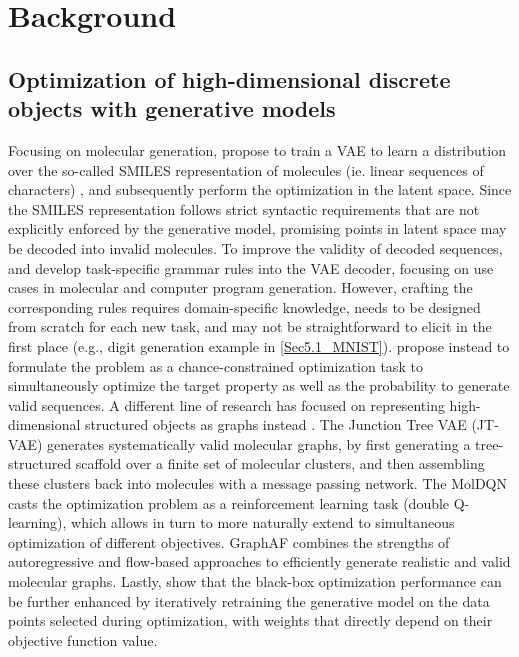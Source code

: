 \section{Background}
\label{Sec2_Background}

\subsection{Optimization of high-dimensional discrete objects with generative models}
\label{Sec2_Background_Optim}

Focusing on molecular generation, \citet{Gomez_Bombarelli_2018} propose to train a VAE to learn a distribution over the so-called SMILES representation of molecules (ie. linear sequences of characters) \citep{weininger88smiles}, and subsequently perform the optimization in the latent space. 
Since the SMILES representation follows strict syntactic requirements that are not explicitly enforced by the generative model, promising points in latent space may be decoded into invalid molecules. 
To improve the validity of decoded sequences, \citet{kusner2017grammar} and \citet{dai2018syntaxdirected} develop task-specific grammar rules into the VAE decoder, focusing on use cases in molecular and computer program generation. However, crafting the corresponding rules requires domain-specific knowledge, needs to be designed from scratch for each new task, and may not be straightforward to elicit in the first place (e.g., digit generation example in \ref{Sec5.1_MNIST}). \citet{liu2020chanceconstrained} propose instead to formulate the problem as a chance-constrained optimization task to simultaneously optimize the target property as well as the probability to generate valid sequences. 
A different line of research has focused on representing high-dimensional structured objects as graphs instead \citep{duvenaud2015convolutional,li2018learning}. The Junction Tree VAE (JT-VAE) \citep{jin2019junction} generates systematically valid molecular graphs, by first generating a tree-structured scaffold over a finite set of molecular clusters, and then assembling these clusters back into molecules with a message passing network. The MolDQN \citep{Zhou_2019MolDQN} casts the optimization problem as a reinforcement learning task (double Q-learning), which allows in turn to more naturally extend to simultaneous optimization of different objectives. GraphAF \citep{shi2020graphaf} combines the strengths of autoregressive and flow-based approaches to efficiently generate realistic and valid molecular graphs.
Lastly, \citet{tripp2020sampleefficient} show that the black-box optimization performance can be further enhanced by iteratively retraining the generative model on the data points selected during optimization, with weights that directly depend on their objective function value.

